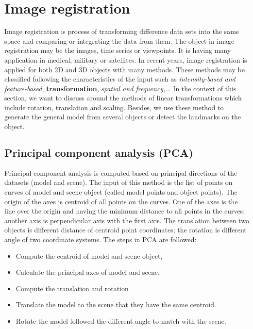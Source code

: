 \section{Image registration}
Image registration is process of transforming difference data sets into the same space and comparing or integrating the data from them. The object in image registration may be the images, time series or viewpoints. It is having many application in medical, military or satellites. In recent years, image registration is applied for both 2D and 3D objects with many methods. These methods may be classified following the characteristics of the input such as \textit{intensity-based and feature-based}, \textbf{transformation}, \textit{spatial and frequency},... In the context of this section, we want to discuss around the methods of linear transformations which include rotation, translation and scaling. Besides, we use these method to generate the general model from several objects or detect the landmarks on the object.
\subsection{Principal component analysis (PCA)}
Principal component analysis is computed based on principal directions of the datasets (model and scene). The input of this method is the list of points on curves of model and scene object (called model points and object points). The origin of the axes is centroid of all points on the curves. One of the axes is the line over the origin and having the minimum distance to all points in the curves; another axis is perpendicular axis with the first axis. The translation between two objects is different distance of centroid point coordinates; the rotation is different angle of two coordinate systems. The steps in PCA are followed:
\begin{itemize}
	\item Compute the centroid of model and scene object,
	\item Calculate the principal axes of model and scene,
	\item Compute the translation and rotation
	\item Translate the model to the scene that they have the same centroid.
	\item Rotate the model followed the different angle to match with the scene.
\end{itemize}
